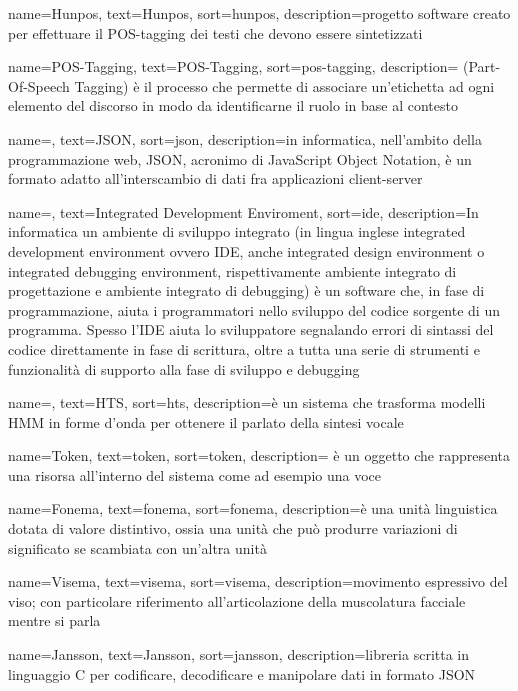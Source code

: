 {
	name=Hunpos,
	text=Hunpos,
	sort=hunpos,
	description={progetto software creato per effettuare il POS-tagging dei testi che devono essere sintetizzati}
}

{
	name=POS-Tagging,
	text=POS-Tagging,
	sort=pos-tagging,
	description={ (Part-Of-Speech Tagging) è il processo che permette di associare un'etichetta ad ogni elemento del discorso in modo da identificarne il ruolo in base al contesto
}
}

{
	name=,
	text=JSON,
	sort=json,
	description={in informatica, nell'ambito della programmazione web, JSON, acronimo di JavaScript Object Notation, è un formato adatto all'interscambio di dati fra applicazioni client-server}
}

{
	name=,
	text=Integrated Development Enviroment,
	sort=ide,
	description={In informatica un ambiente di sviluppo integrato (in lingua inglese integrated development environment ovvero IDE, anche integrated design environment o integrated debugging environment, rispettivamente ambiente integrato di progettazione e ambiente integrato di debugging) è un software che, in fase di programmazione, aiuta i programmatori nello sviluppo del codice sorgente di un programma. Spesso l'IDE aiuta lo sviluppatore segnalando errori di sintassi del codice direttamente in fase di scrittura, oltre a tutta una serie di strumenti e funzionalità di supporto alla fase di sviluppo e debugging}
}

{
	name=,
	text=HTS,
	sort=hts,
	description={è un sistema che trasforma modelli HMM in forme d'onda per ottenere il parlato della sintesi vocale}
}

{
	name=Token,
	text=token,
	sort=token,
	description={ è un oggetto che rappresenta una risorsa all'interno del sistema come ad esempio una voce}
}

{
	name=Fonema,
	text=fonema,
	sort=fonema,
	description={è una unità linguistica dotata di valore distintivo, ossia una unità che può produrre variazioni di significato se scambiata con un'altra unità}
}

{
	name=Visema,
	text=visema,
	sort=visema,
	description={movimento espressivo del viso; con particolare riferimento all'articolazione della muscolatura facciale mentre si parla}
}

{
	name=Jansson,
	text=Jansson,
	sort=jansson,
	description={libreria scritta in linguaggio C per codificare, decodificare e manipolare dati in formato JSON}
}

